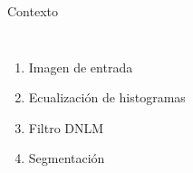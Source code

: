 \documentclass[15pt]{beamer} %
\begin{document}
\begin{frame}{Contexto}

\begin{columns}
    \begin{enumerate}
    \item <1-| alert@1> Imagen de entrada
    \item <2-| alert@2> Ecualizaci\'on de histogramas
    \item <3-| alert@3> Filtro DNLM
    \item <4-| alert@4> Segmentaci\'on
    \end{enumerate}

\end{columns}
\end{frame}
\end{document}
